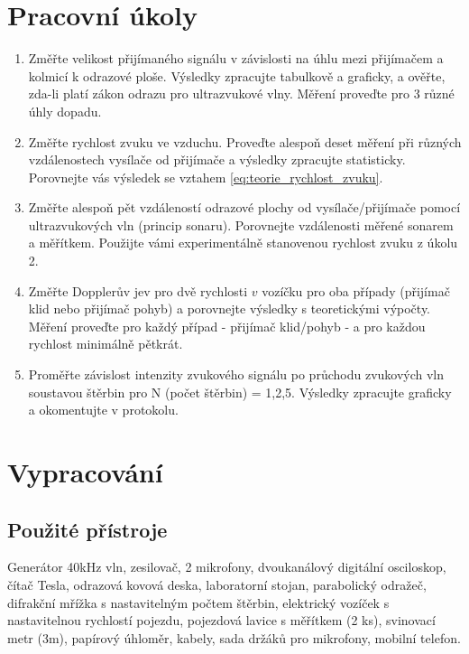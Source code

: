 \documentclass[english]{article}
\begin{document}




\setlength{\parindent}{0.5cm}

\section{Pracovní úkoly}
\begin{enumerate}
  \item Změřte velikost přijímaného signálu v závislosti na úhlu mezi přijímačem a kolmicí k odrazové ploše. Výsledky zpracujte tabulkově a graficky, a ověřte, zda-li platí zákon odrazu pro ultrazvukové vlny. Měření proveďte pro 3 různé úhly dopadu.
  \item Změřte rychlost zvuku ve vzduchu. Proveďte alespoň deset měření při různých vzdálenostech vysílače od přijímače a výsledky zpracujte statisticky. Porovnejte vás výsledek se vztahem \ref{eq:teorie_rychlost_zvuku}.
  \item Změřte alespoň pět vzdáleností odrazové plochy od vysílače/přijímače pomocí ultrazvukových vln (princip sonaru). Porovnejte vzdálenosti měřené sonarem a měřítkem. Použijte vámi experimentálně stanovenou rychlost zvuku z úkolu 2.
  \item Změřte Dopplerův jev pro dvě rychlosti $v$ vozíčku pro oba případy (přijímač klid nebo přijímač pohyb) a porovnejte výsledky s teoretickými výpočty. Měření proveďte pro každý případ - přijímač klid/pohyb - a pro každou rychlost minimálně pětkrát.
  \item Proměřte závislost intenzity zvukového signálu po průchodu zvukových vln soustavou štěrbin pro N (počet štěrbin) = 1,2,5. Výsledky zpracujte graficky a okomentujte v protokolu.
\end{enumerate}

\section{Vypracování}

\subsection{Použité přístroje}
Generátor 40kHz vln, zesilovač, 2 mikrofony, dvoukanálový digitální osciloskop, čítač Tesla, odrazová
kovová deska, laboratorní stojan, parabolický odražeč, difrakční mřížka s nastavitelným počtem štěrbin, elektrický
vozíček s nastavitelnou rychlostí pojezdu, pojezdová lavice s měřítkem (2 ks), svinovací metr (3m), papírový úhloměr, kabely, sada držáků pro mikrofony, mobilní telefon.
\end{document}
